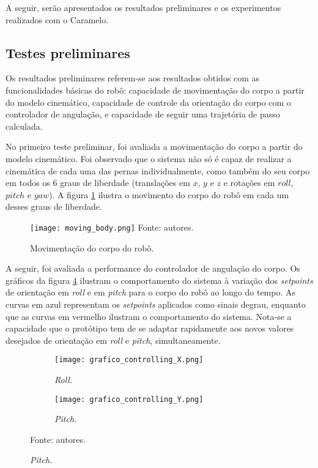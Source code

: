 \documentclass[../main.tex]{subfiles}
\begin{document}
  A seguir, serão apresentados os resultados preliminares e os experimentos realizados com o Caramelo. 
  
  \subsection{Testes preliminares}
  \label{subsec:testes_preliminares}
  
  Os resultados preliminares referem-se aos resultados obtidos com as funcionalidades básicas do robô: capacidade de movimentação do corpo a partir do modelo cinemático, capacidade de controle da orientação do corpo com o controlador de angulação, e capacidade de seguir uma trajetória de passo calculada.

  No primeiro teste preliminar, foi avaliada a movimentação do corpo a partir do modelo cinemático. Foi observado que o sistema não só é capaz de realizar a cinemática de cada uma das pernas individualmente, como também do seu corpo em todos os 6 graus de liberdade (translações em $x$, $y$ e $z$ e rotações em $roll$, $pitch$ e $yaw$). A figura \ref{fig:moving_body} ilustra o movimento do corpo do robô em cada um desses graus de liberdade.

  \begin{figure}[!htb]
    \centering
    \caption{Movimentação do corpo do robô.}
    \texttt{[image: moving\_body.png]}
    Fonte: autores.
    \vspace{-\baselineskip}
    \label{fig:moving_body}
  \end{figure}

  A seguir, foi avaliada a performance do controlador de angulação do corpo. Os gráficos da figura \ref{fig:grafico_controlling} ilustram o comportamento do sistema à variação dos \textit{setpoints} de orientação em \textit{roll} e em \textit{pitch} para o corpo do robô ao longo do tempo. As curvas em azul representam os \textit{setpoints} aplicados como sinais degrau, enquanto que as curvas em vermelho ilustram o comportamento do sistema. Nota-se a capacidade que o protótipo tem de se adaptar rapidamente aos novos valores desejados de orientação em \textit{roll} e \textit{pitch}, simultaneamente.

  \begin{figure}
    \centering
    \caption{Respostas dos controles de angulação.}
    \begin{subfigure}[t]{0.48\textwidth}
      \centering
      \texttt{[image: grafico\_controlling\_X.png]}
      \caption{\textit{Roll.}}
      \label{fig:controlling_roll}
    \end{subfigure}
    \begin{subfigure}[t]{0.48\textwidth}
      \centering
      \texttt{[image: grafico\_controlling\_Y.png]}
      \caption{\textit{Pitch.}}
      \label{fig:controlling_pitch}
    \end{subfigure}
    Fonte: autores.
    \label{fig:grafico_controlling}
  \end{figure}
\end{document}
